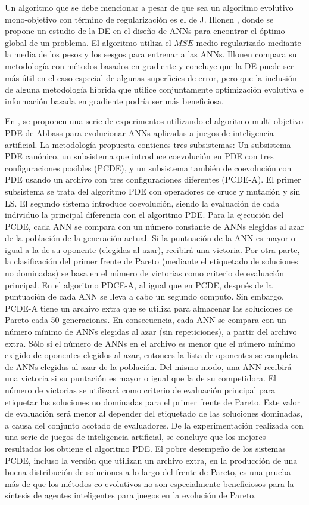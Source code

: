Un algoritmo que se debe mencionar a pesar de que sea un algoritmo evolutivo
mono-objetivo con término de regularización es el de J. Illonen \cite{Jarno2003}, donde
se propone un estudio de la DE en el diseño de ANNs para encontrar el óptimo global de
un problema. El algoritmo utiliza el $MSE$ medio regularizado mediante la media de los pesos y los
sesgos para entrenar a las ANNs. Illonen compara su metodología con métodos basados en gradiente y
concluye que la DE puede ser más útil en el caso especial de algunas superficies de
error, pero que la inclusión de alguna metodología híbrida que utilice conjuntamente
optimización evolutiva e información basada en gradiente podría ser más beneficiosa.

En \cite{Yau2007}, se proponen una serie de experimentos utilizando el algoritmo
multi-objetivo PDE de Abbass para evolucionar ANNs aplicadas a juegos de inteligencia
artificial. La metodología propuesta contienes tres subsistemas: Un subsistema PDE canónico, un
subsistema que introduce coevolución en PDE con tres
configuraciones posibles (PCDE), y un subsistema también de coevolución con PDE usando un
archivo con tres configuraciones diferentes (PCDE-A). El primer subsistema se trata del algoritmo
PDE con operadores de cruce y mutación y sin LS. El segundo sistema introduce coevolución,
siendo la evaluación de cada individuo la principal diferencia con el algoritmo PDE. Para la
ejecución
del PCDE, cada ANN se compara con un número constante de ANNs elegidas al azar de la
población de la generación actual. Si la puntuación de la ANN es mayor o igual a la de su
oponente (elegidas al azar), recibirá una victoria. Por otra parte, la clasificación del
primer frente de Pareto (mediante el etiquetado de soluciones no dominadas) se basa en el
	número de victorias como criterio de evaluación principal. En el algoritmo PDCE-A, al
igual
que en PCDE, después de la puntuación de cada ANN se lleva a cabo un segundo computo.
Sin embargo, PCDE-A tiene un archivo extra que se utiliza para almacenar las soluciones
de Pareto cada 50 generaciones. En consecuencia, cada ANN se compara con un número
mínimo de ANNs elegidas al azar (sin repeticiones), a partir del archivo extra. Sólo si el
número de ANNs en el archivo es menor que el número mínimo exigido de oponentes elegidos al
azar, entonces la lista de oponentes se completa de ANNs elegidas al azar de la
población. Del mismo modo, una ANN recibirá una victoria si su puntación es mayor o
igual que la de su competidora. El número de victorias se utilizará como
criterio de evaluación principal para etiquetar las soluciones no dominadas para
el primer frente de Pareto. Este valor de evaluación será menor al depender del
etiquetado de las soluciones dominadas, a causa del conjunto acotado de
evaluadores. De la experimentación realizada con una serie de juegos de inteligencia
artificial, se concluye que los mejores resultados los obtiene el algoritmo PDE. El pobre
desempeño de los sistemas PCDE, incluso la versión que utilizan un archivo extra, en la
producción de una buena distribución de soluciones a lo largo del frente de Pareto, es una
prueba más de que los métodos co-evolutivos no son especialmente beneficiosos para la
síntesis de agentes inteligentes para juegos en la evolución de Pareto.

